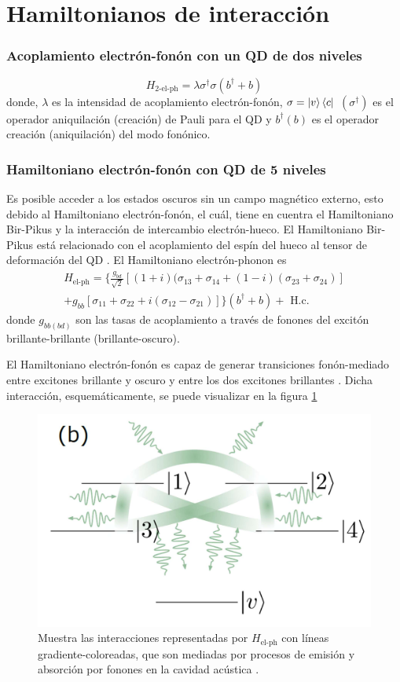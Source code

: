 \documentclass[main.tex]{subfiles}
\begin{document}
\section{Hamiltonianos de interacción}

\subsubsection{Acoplamiento electrón-fonón con un QD de dos niveles}
\begin{equation}
	H_\text{2-el-ph} = \lambda \sigma^\dagger \sigma (b^\dagger + b)
\end{equation}
donde, $\lambda$ es la intensidad de acoplamiento electrón-fonón, $\sigma = \ket{v}\bra{c}$  $(\sigma^\dagger)$ es el operador aniquilación (creación) de Pauli para el QD y $b^\dagger (b)$ es el operador creación (aniquilación) del modo fonónico.

\subsubsection{Hamiltoniano electrón-fonón con QD de 5 niveles}
Es posible acceder a los estados oscuros sin un campo magnético externo, esto debido al Hamiltoniano electrón-fonón, el cuál, tiene en cuentra el Hamiltoniano Bir-Pikus y la interacción de intercambio electrón-hueco. El Hamiltoniano Bir-Pikus está relacionado con el acoplamiento del espín del hueco al tensor de deformación del QD \parencite{Woods2004}. El Hamiltoniano electrón-phonon es
\begin{multline}\label{eq:H_el-ph}
	H_\text{el-ph} = \big\{\frac{g_{bd}}{\sqrt{2}}[(1+i)(\sigma_{13} + \sigma_{14} + (1-i)(\sigma_{23} + \sigma_{24})]\\ + g_{bb} [\sigma_{11} + \sigma_{22} + i(\sigma_{12} - \sigma_{21})] \big\} (b^\dagger + b) + \text{ H.c.}
\end{multline}
donde $g_{bb(bd)}$ son las tasas de acoplamiento a través de fonones del excitón brillante-brillante (brillante-oscuro).

El Hamiltoniano electrón-fonón es capaz de generar transiciones fonón-mediado entre excitones brillante y oscuro y entre los dos excitones brillantes \parencite{Roszak2007}. Dicha interacción, esquemáticamente, se puede visualizar en la figura \ref{fig:electron-phonon}
\begin{figure}[th]
	\centering
	\includegraphics[width=0.35\linewidth]{img/electron-phonon}
	\caption{Muestra las interacciones representadas por $H_\text{el-ph}$ con líneas gradiente-coloreadas, que son mediadas por procesos de emisión y absorción por fonones en la cavidad acústica \parencite{Vargas2022}.}
	\label{fig:electron-phonon}
\end{figure}
\end{document}
